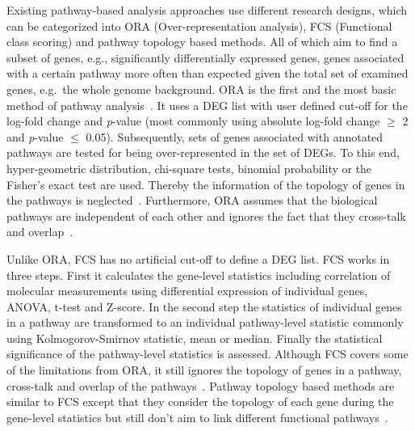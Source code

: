 \documentclass[10pt,a4paper,twocolumn]{article}
\begin{document}
	
	Existing pathway-based analysis approaches use different research
	designs, which can be categorized into ORA (Over-representation
	analysis), FCS (Functional class scoring) and pathway topology based
	methods. All of which aim to find a subset of genes, e.g.,
	significantly differentially expressed genes, genes associated with a
	certain pathway more often than expected given the total set of
	examined genes, e.g.~the whole genome background. ORA is
	the first and the most basic method of pathway analysis~\cite{Campos}. It uses a
	DEG list with user defined cut-off for the log-fold change and
	\textit{p}-value (most commonly using absolute log-fold change $\geq$
	2 and \textit{p}-value $\leq$ 0.05). Subsequently, sets of genes
	associated with annotated pathways are tested for being
	over-represented in the set of DEGs. To this end, hyper-geometric
	distribution, chi-square tests, binomial probability or the Fisher’s
	exact test are used. Thereby the information of the topology of genes
	in the pathways is neglected~\cite{Bayer}. Furthermore, ORA assumes
	that the biological pathways are independent of each other and ignores
	the fact that they cross-talk and overlap~\cite{Khatri2012,Campos}.
	
	Unlike ORA, FCS has no artificial cut-off to define a DEG list. FCS works in
	three steps. First it calculates the gene-level statistics including
	correlation of molecular measurements using differential expression of
	individual genes, ANOVA, t-test and Z-score. In the second step the
	statistics of individual genes in a pathway are transformed to an
	individual pathway-level statistic commonly using Kolmogorov-Smirnov
	statistic, mean or median. Finally the statistical significance of the
	pathway-level statistics is assessed. Although FCS covers some of the
	limitations from ORA, it still ignores the topology of genes in a pathway,
	cross-talk and overlap of the pathways~\cite{Khatri2012,Campos}. Pathway
	topology based methods are similar to FCS except that they consider the
	topology of each gene during the gene-level statistics but still don't aim
	to link different functional pathways~\cite{Khatri2012}.
	
\end{document}
